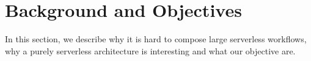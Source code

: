 \section{Background and Objectives}\label{sec:bg}






In this section, we describe why it is hard to compose large serverless
workflows, why a purely serverless architecture is interesting and what our
objective are.


